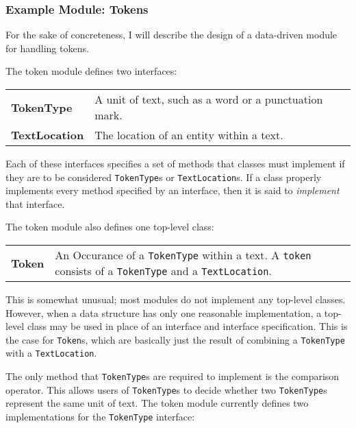 \documentclass{article}
\begin{document}
\subsubsection{Example Module: Tokens}

For the sake of concreteness, I will describe the design of a
data-driven module for handling tokens.  

The token module defines two interfaces:

\vspace{1.2mm}\noindent
\begin{tabular}{||p{}p{}}
  \textbf{TokenType} & A unit of text, such as a word or a
  punctuation mark. \\

  \textbf{TextLocation} & The location of an entity within a
  text.\\
\end{tabular}
\vspace{1mm}

\noindent
Each of these interfaces specifies a set of methods that classes must
implement if they are to be considered \texttt{TokenType}s or
\texttt{TextLocation}s.  If a class properly implements every method specified
by an interface, then it is said to \emph{implement} that interface.

The token module also defines one top-level class:

\vspace{1.2mm}\noindent
\begin{tabular}{||p{}p{}}
  \textbf{Token} & An Occurance of a \texttt{TokenType}
  within a text.  A \texttt{token} consists of a \texttt{TokenType}
  and a \texttt{TextLocation}. \\
\end{tabular}
\vspace{1mm}

\noindent
This is somewhat unusual; most modules do not implement any top-level
classes.  However, when a data structure has only one reasonable
implementation, a top-level class may be used in place of an interface 
and interface specification.  This is the case for \texttt{Token}s,
which are basically just the result of combining a \texttt{TokenType} 
with a \texttt{TextLocation}.

The only method that \texttt{TokenType}s are required to implement is
the comparison operator.  This allows users of \texttt{TokenType}s to
decide whether two \texttt{TokenType}s represent the same unit of
text.  The token module currently defines two implementations for the
\texttt{TokenType} interface:
\end{document}
